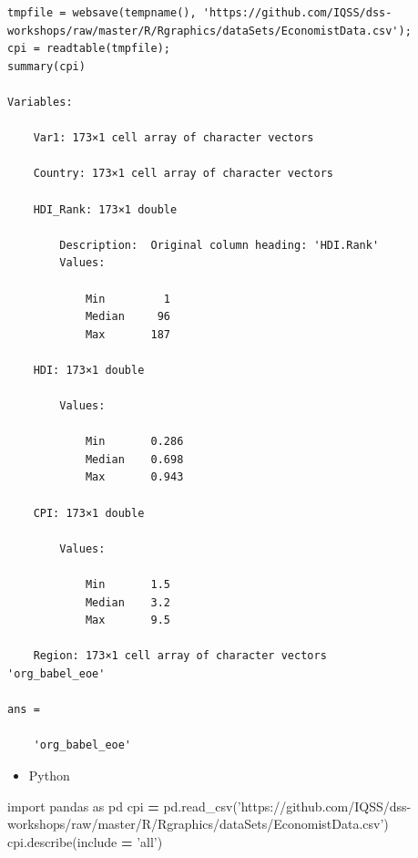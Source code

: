 \documentclass[]{book}
\newenvironment{Shaded}{\begin{snugshade}}{\end{snugshade}}
\newcommand{\ImportTok}[1]{#1}
\newcommand{\NormalTok}[1]{#1}
\newcommand{\OperatorTok}[1]{\textcolor[rgb]{0.81,0.36,0.00}{\textbf{#1}}}
\newcommand{\StringTok}[1]{\textcolor[rgb]{0.31,0.60,0.02}{#1}}
\providecommand{\tightlist}{%
  \setlength{\itemsep}{0pt}\setlength{\parskip}{0pt}}
\begin{document}
\begin{verbatim}
tmpfile = websave(tempname(), 'https://github.com/IQSS/dss-workshops/raw/master/R/Rgraphics/dataSets/EconomistData.csv');
cpi = readtable(tmpfile);
summary(cpi)

Variables:

    Var1: 173×1 cell array of character vectors

    Country: 173×1 cell array of character vectors

    HDI_Rank: 173×1 double

        Description:  Original column heading: 'HDI.Rank'
        Values:

            Min         1       
            Median     96       
            Max       187       

    HDI: 173×1 double

        Values:

            Min       0.286
            Median    0.698
            Max       0.943

    CPI: 173×1 double

        Values:

            Min       1.5  
            Median    3.2  
            Max       9.5  

    Region: 173×1 cell array of character vectors
'org_babel_eoe'

ans =

    'org_babel_eoe'
\end{verbatim}

\begin{itemize}
\tightlist
\item
  Python
\end{itemize}

\begin{Shaded}
\begin{Highlighting}[]
\ImportTok{import}\NormalTok{ pandas }\ImportTok{as}\NormalTok{ pd}
\NormalTok{cpi }\OperatorTok{=}\NormalTok{ pd.read_csv(}\StringTok{'https://github.com/IQSS/dss-workshops/raw/master/R/Rgraphics/dataSets/EconomistData.csv'}\NormalTok{)}
\NormalTok{cpi.describe(include }\OperatorTok{=} \StringTok{'all'}\NormalTok{)}
\end{Highlighting}
\end{Shaded}
\end{document}
